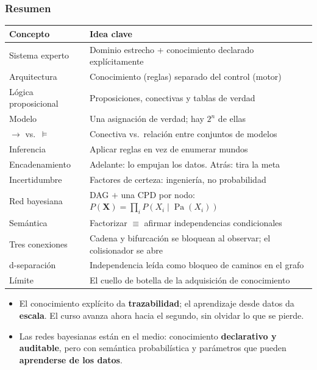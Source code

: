 \documentclass[aspectratio=169, 10pt]{beamer}
\providecommand{\Pa}{\operatorname{Pa}}
\begin{document}
\begin{frame}
\frametitle{Resumen}
\begin{center}
\footnotesize
\begin{tabular}{ll}
\toprule
\textbf{Concepto} & \textbf{Idea clave}\\
\midrule
Sistema experto     & Dominio estrecho + conocimiento declarado expl\'icitamente\\
Arquitectura        & Conocimiento (reglas) separado del control (motor)\\
L\'ogica proposicional & Proposiciones, conectivas y tablas de verdad\\
Modelo              & Una asignaci\'on de verdad; hay $2^n$ de ellas\\
$\rightarrow$ vs.\ $\models$ & Conectiva vs.\ relaci\'on entre conjuntos de modelos\\
Inferencia          & Aplicar reglas en vez de enumerar mundos\\
Encadenamiento      & Adelante: lo empujan los datos. Atr\'as: tira la meta\\
Incertidumbre       & Factores de certeza: ingenier\'ia, no probabilidad\\
Red bayesiana       & DAG $+$ una CPD por nodo: $P(\mathbf{X})=\prod_i P(X_i\mid \Pa(X_i))$\\
Semántica           & Factorizar $\equiv$ afirmar independencias condicionales\\
Tres conexiones     & Cadena y bifurcaci\'on se bloquean al observar; el colisionador se abre\\
d-separaci\'on      & Independencia le\'ida como bloqueo de caminos en el grafo\\
L\'imite            & El cuello de botella de la adquisici\'on de conocimiento\\
\bottomrule
\end{tabular}
\end{center}
\vspace{0.7em}
\begin{itemize}
	\item El conocimiento explícito da \textbf{trazabilidad}; el aprendizaje desde datos da \textbf{escala}. El curso avanza ahora hacia el segundo, sin olvidar lo que se pierde.
	\item Las redes bayesianas est\'an en el medio: conocimiento \textbf{declarativo y auditable}, pero con sem\'antica probabil\'istica y par\'ametros que pueden \textbf{aprenderse de los datos}.
\end{itemize}
\end{frame}
\end{document}
